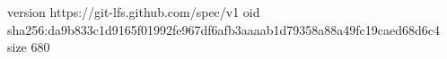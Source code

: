 version https://git-lfs.github.com/spec/v1
oid sha256:da9b833c1d9165f01992fe967df6afb3aaaab1d79358a88a49fc19caed68d6c4
size 680
